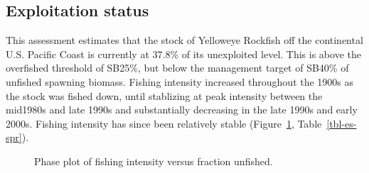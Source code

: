 \documentclass[
]{scrartcl}
\begin{document}
\subsection*{Exploitation status}\label{exploitation-status}

This assessment estimates that the stock of Yelloweye Rockfish off the
continental U.S. Pacific Coast is currently at 37.8\% of its unexploited
level. This is above the overfished threshold of SB25\%, but below the
management target of SB40\% of unfished spawning biomass. Fishing
intensity increased throughout the 1900s as the stock was fished down,
until stablizing at peak intensity between the mid1980s and late 1990s
and substantially decreasing in the late 1990s and early 2000s. Fishing
intensity has since been relatively stable (Figure~\ref{fig-es-kobe},
Table~\ref{tbl-es-spr}).

\begin{figure}[H]


\caption{\label{fig-es-kobe}Phase plot of fishing intensity versus
fraction unfished.}

\end{figure}%
\end{document}
